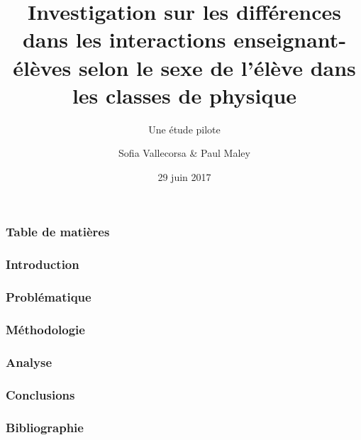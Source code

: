 \documentclass{beamer}
\title{Investigation sur les différences dans les interactions
  enseignant-élèves selon le sexe de l’élève dans les classes
  de physique}
\subtitle{Une étude pilote }
\author{Sofia Vallecorsa \& Paul Maley}
\date{29 juin 2017}
\begin{document}
\frame{\titlepage}

\begin{frame}
\frametitle{Table de matières}
\tableofcontents
\end{frame}

\begin{frame}
\frametitle{Introduction}
\end{frame}

\begin{frame}
\frametitle{Problématique}
\end{frame}

\begin{frame}
\frametitle{Méthodologie}
\end{frame}

\begin{frame}
\frametitle{Analyse}
\end{frame}

\begin{frame}
\frametitle{Conclusions}
\end{frame}

\begin{frame}
\frametitle{Bibliographie}
\end{frame}
\end{document}
